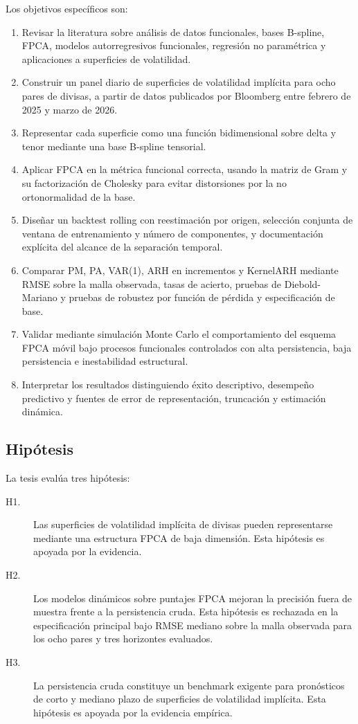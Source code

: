 \documentclass[a4paper,11pt]{article}
\newcommand{\SVIs}{superficies de volatilidad implícita}
\begin{document}
Los objetivos específicos son:

\begin{enumerate}
  \item Revisar la literatura sobre análisis de datos funcionales, bases B-spline, FPCA, modelos autorregresivos funcionales, regresión no paramétrica y aplicaciones a superficies de volatilidad.
  \item Construir un panel diario de \SVIs{} para ocho pares de divisas, a partir de datos publicados por Bloomberg entre febrero de 2025 y marzo de 2026.
  \item Representar cada superficie como una función bidimensional sobre delta y tenor mediante una base B-spline tensorial.
  \item Aplicar FPCA en la métrica funcional correcta, usando la matriz de Gram y su factorización de Cholesky para evitar distorsiones por la no ortonormalidad de la base.
  \item Diseñar un backtest rolling con reestimación por origen, selección conjunta de ventana de entrenamiento y número de componentes, y documentación explícita del alcance de la separación temporal.
  \item Comparar PM, PA, VAR(1), ARH en incrementos y KernelARH mediante RMSE sobre la malla observada, tasas de acierto, pruebas de Diebold-Mariano y pruebas de robustez por función de pérdida y especificación de base.
  \item Validar mediante simulación Monte Carlo el comportamiento del esquema FPCA móvil bajo procesos funcionales controlados con alta persistencia, baja persistencia e inestabilidad estructural.
  \item Interpretar los resultados distinguiendo éxito descriptivo, desempeño predictivo y fuentes de error de representación, truncación y estimación dinámica.
\end{enumerate}

\subsection{Hipótesis}

La tesis evalúa tres hipótesis:

\begin{description}
  \item[H1.] Las \SVIs{} de divisas pueden representarse mediante una estructura FPCA de baja dimensión. Esta hipótesis es apoyada por la evidencia.
  \item[H2.] Los modelos dinámicos sobre puntajes FPCA mejoran la precisión fuera de muestra frente a la persistencia cruda. Esta hipótesis es rechazada en la especificación principal bajo RMSE mediano sobre la malla observada para los ocho pares y tres horizontes evaluados.
  \item[H3.] La persistencia cruda constituye un benchmark exigente para pronósticos de corto y mediano plazo de \SVIs{}. Esta hipótesis es apoyada por la evidencia empírica.
\end{description}
\end{document}
